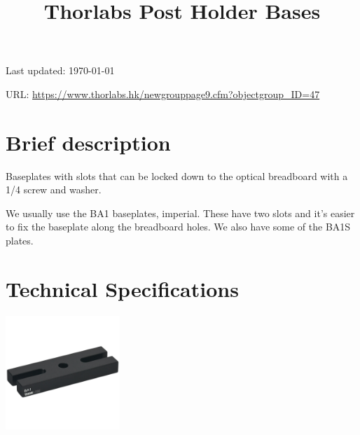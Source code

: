 \documentclass{article}
\title{\vspace{-4cm}Thorlabs Post Holder Bases}
\date{}
\begin{document}
\maketitle

\vspace{-1cm}

Last updated: \today

URL: \url{https://www.thorlabs.hk/newgrouppage9.cfm?objectgroup_ID=47}

\begin{multicols}{2}

\section{Brief description}

Baseplates with slots that can be locked down to the optical breadboard with a 1/4 screw and washer.

We usually use the BA1 baseplates, imperial. These have two slots and it's easier to fix the baseplate along the breadboard holes. We also have some of the BA1S plates.




\section{Technical Specifications}


\begin{center}
\includegraphics[width=4.3cm]{assets/ba1.jpg}
\end{center}


\end{multicols}
\end{document}
